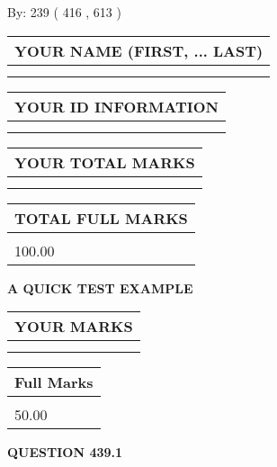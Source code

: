 \documentclass[12pt]{article}
\begin{document}
   
\hspace{1.0in} By: 
 239 ( 416 ,  613 )
   
   
   
   
\newpage 
\setcounter{page}{ 
   439001 } 
   
   
   
   
\noindent\begin{tabular}{|l|}
\hline
YOUR NAME (FIRST, ... LAST)  \\
\hline
 \\ 
 \\ 
\hline
\end{tabular}
\hspace{0.05in} \begin{tabular}{|l|}
\hline
 YOUR   ID   INFORMATION  \\
\hline
 \\ 
 \\ 
\hline
\end{tabular}
   
   
\vspace{0.2in}\noindent\begin{tabular}{|l|}
\hline
YOUR TOTAL MARKS  \\
\hline
 \\ 
 \\ 
\hline
\end{tabular}
\hspace{0.05in} \begin{tabular}{|l|}
\hline
TOTAL FULL MARKS  \\
\hline
 \\ 
100.00 \\
\hline
\end{tabular}
   
   
 \vspace{0.2in}
{\LARGE {\textbf{ A QUICK TEST EXAMPLE}}}
   
   
  
\vspace{0.2in}
  
\noindent\begin{tabular}{|l|}
\hline
 YOUR MARKS  \\
\hline
 \\ 
 \\ 
\hline
\end{tabular}
\hspace{0.05in} \begin{tabular}{|l|}
\hline
 Full Marks  \\
\hline
 \\ 
50.00 \\
\hline
\end{tabular}
{\textbf{\Large{QUESTION
439.1 
}}}
  
\end{document}
